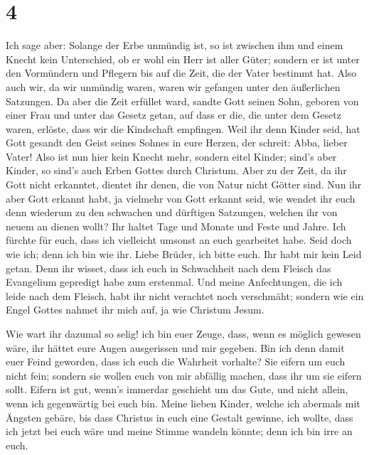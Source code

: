 \hypertarget{section-3}{%
\section{4}\label{section-3}}

 Ich sage aber: Solange der Erbe unmündig ist, so ist
zwischen ihm und einem Knecht kein Unterschied, ob er wohl ein Herr ist
aller Güter;  sondern er ist unter den Vormündern und
Pflegern bis auf die Zeit, die der Vater bestimmt hat. 
Also auch wir, da wir unmündig waren, waren wir gefangen unter den
äußerlichen Satzungen.  Da aber die Zeit erfüllet ward,
sandte Gott seinen Sohn, geboren von einer Frau und unter das Gesetz
getan,  auf dass er die, die unter dem Gesetz waren,
erlöste, dass wir die Kindschaft empfingen.  Weil ihr denn
Kinder seid, hat Gott gesandt den Geist seines Sohnes in eure Herzen,
der schreit: Abba, lieber Vater!  Also ist nun hier kein
Knecht mehr, sondern eitel Kinder; sind's aber Kinder, so sind's auch
Erben Gottes durch Christum.  Aber zu der Zeit, da ihr
Gott nicht erkanntet, dientet ihr denen, die von Natur nicht Götter
sind.  Nun ihr aber Gott erkannt habt, ja vielmehr von
Gott erkannt seid, wie wendet ihr euch denn wiederum zu den schwachen
und dürftigen Satzungen, welchen ihr von neuem an dienen wollt?
 Ihr haltet Tage und Monate und Feste und Jahre.
 Ich fürchte für euch, dass ich vielleicht umsonst an
euch gearbeitet habe.  Seid doch wie ich; denn ich bin
wie ihr. Liebe Brüder, ich bitte euch. Ihr habt mir kein Leid getan.
 Denn ihr wisset, dass ich euch in Schwachheit nach dem
Fleisch das Evangelium gepredigt habe zum erstenmal.  Und
meine Anfechtungen, die ich leide nach dem Fleisch, habt ihr nicht
verachtet noch verschmäht; sondern wie ein Engel Gottes nahmet ihr mich
auf, ja wie Christum Jesum.

 Wie wart ihr dazumal so selig! ich bin euer Zeuge, dass,
wenn es möglich gewesen wäre, ihr hättet eure Augen ausgerissen und mir
gegeben.  Bin ich denn damit euer Feind geworden, dass
ich euch die Wahrheit vorhalte?  Sie eifern um euch nicht
fein; sondern sie wollen euch von mir abfällig machen, dass ihr um sie
eifern sollt.  Eifern ist gut, wenn's immerdar geschieht
um das Gute, und nicht allein, wenn ich gegenwärtig bei euch bin.
 Meine lieben Kinder, welche ich abermals mit Ängsten
gebäre, bis dass Christus in euch eine Gestalt gewinne, 
ich wollte, dass ich jetzt bei euch wäre und meine Stimme wandeln
könnte; denn ich bin irre an euch.

